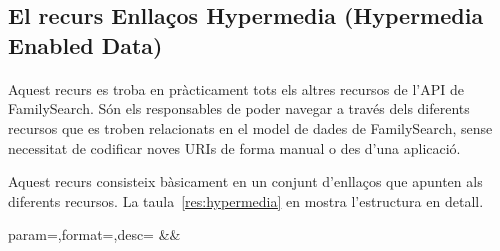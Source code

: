 \subsection{El recurs Enllaços Hypermedia (Hypermedia Enabled Data)}

    \paragraph{}
    Aquest recurs es troba en pràcticament tots els altres recursos de l'API de Family\-Search. Són els responsables de poder navegar a través dels diferents recursos que es troben relacionats en el model de dades de FamilySearch, sense necessitat de codificar noves URIs de forma manual o des d'una aplicació.

    Aquest recurs consisteix bàsicament en un conjunt d'enllaços que apunten als diferents recursos. La taula~\ref{res:hypermedia} en mostra l'estructura en detall.

    \begin{center}
             {param=\param,format=\format,desc=\desc}
             {\param&\format&\desc}
     \end{center}

